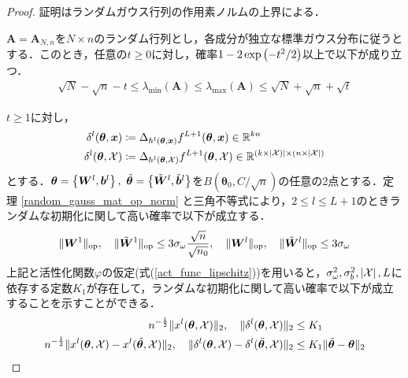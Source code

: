 \begin{proof}
    証明はランダムガウス行列の作用素ノルムの上界による．
    \begin{thm}
        \label{random_gauss_mat_op_norm}
        $\bm{A} = \bm{A}_{N, n}$を$N \times n$のランダム行列とし，各成分が独立な標準ガウス分布に従うとする．このとき，任意の$t \geq 0$に対し，確率$1 - 2\exp\left(-t^2/2\right)$以上で以下が成り立つ．
        \begin{align}
            \sqrt{N} - \sqrt{n} - t \leq \lambda_{\min}(\bm{A}) \leq \lambda_{\max}(\bm{A}) \leq \sqrt{N} + \sqrt{n} + \sqrt{t}
        \end{align}
    \end{thm}
    $t \geq 1$に対し，
    \begin{align}
        \delta^l (\bm{\theta}, \bm{x}) &\coloneqq \Delta_{h^l(\bm{\theta}, \bm{x})}f^{L+1}(\bm{\theta}, \bm{x}) \in \mathbb{R}^{kn} \\
        \delta^l (\bm{\theta}, \mathcal{X}) &\coloneqq \Delta_{h^l(\bm{\theta}, \mathcal{X})}f^{L+1}(\bm{\theta}, \mathcal{X}) \in \mathbb{R}^{{(k \times \left|\mathcal{X})\right|} \times (n \times \left|\mathcal{X}\right|)}
    \end{align}
    とする．$\bm{\theta} = \left\{\bm{W}^l, \bm{b}^l\right\}, \ \tilde{\bm{\theta}} = \left\{\tilde{\bm{W}}^l, \tilde{\bm{b}}^l\right\}$を$B(\bm{\theta}_0, C/\sqrt{n})$の任意の2点とする．定理 \ref{random_gauss_mat_op_norm} と三角不等式により，$2 \leq l \leq L+1$のときランダムな初期化に関して高い確率で以下が成立する．
    \begin{align}
        \|\bm{W}^1\|_{\mathrm{op}}, \quad \|\tilde{\bm{W}}^1\|_{\mathrm{op}} \leq 3\sigma_{\omega}\dfrac{\sqrt{n}}{\sqrt{n_0}}, \quad \|\bm{W}^l\|_{\mathrm{op}}, \quad \|\tilde{\bm{W}}^l\|_{\mathrm{op}} \leq 3\sigma_{\omega}
    \end{align}
    上記と活性化関数$\varphi$の仮定(式(\ref{act_func_lipschitz}))を用いると，$\sigma_{\omega}^2, \sigma_{b}^2, \left|\mathcal{X}\right|, L$に依存する定数$K_1$が存在して，ランダムな初期化に関して高い確率で以下が成立することを示すことができる．
    \begin{align}
        n^{-\frac{1}{2}}\norm{x^l(\bm{\theta}, \mathcal{X})}_2, \quad \norm{\delta^l (\bm{\theta}, \mathcal{X})}_2 &\leq K_1 \\
        n^{-\frac{1}{2}}\norm{x^l(\bm{\theta}, \mathcal{X}) - x^l(\tilde{\bm{\theta}}, \mathcal{X})}_2, \quad \norm{\delta^l (\bm{\theta}, \mathcal{X}) - \delta^l (\tilde{\bm{\theta}}, \mathcal{X})}_2 &\leq K_1\norm{\tilde{\bm{\theta}} - \bm{\theta}}_2

\end{align}
\end{proof}
